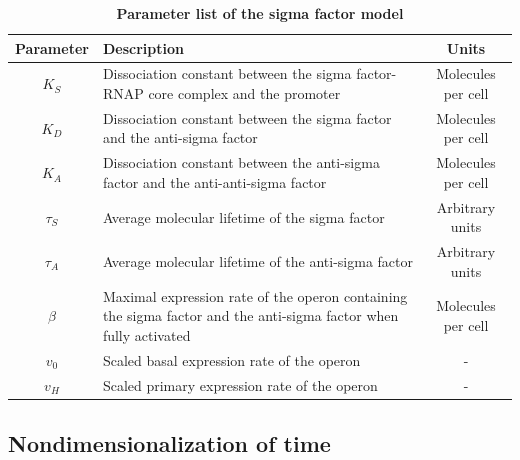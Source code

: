 \begin{table}[ht]
    \centering
    \begin{tabular}{|c|p{3.5in}|c|}\hline
        Parameter & Description & Units\\\hline
        $K_S$ & Dissociation constant between the sigma factor-
        RNAP core complex and the promoter & Molecules per cell\\
        $K_D$ & Dissociation constant between the sigma factor
        and the anti-sigma factor & Molecules per cell\\
        $K_A$ & Dissociation constant between the anti-sigma factor
        and the anti-anti-sigma factor & Molecules per cell\\
        $\tau_S$ & Average molecular lifetime of the sigma factor &
        Arbitrary units\\
        $\tau_A$ & Average molecular lifetime of the anti-sigma factor &
        Arbitrary units\\
        $\beta$ & Maximal expression rate of the operon containing the sigma
        factor and the anti-sigma factor when fully activated
        & Molecules per cell\\
        $v_0$ & Scaled basal expression rate of the operon & -\\
        $v_H$ & Scaled primary expression rate of the operon & -\\\hline
    \end{tabular}
    \caption[Parameter list of the sigma factor model]
    {\textbf{Parameter list of the sigma factor model}}
    \label{tab:general_model_paras}
\end{table}

\subsection{Nondimensionalization of time}
\label{sec:methods_nondim_time}    %


